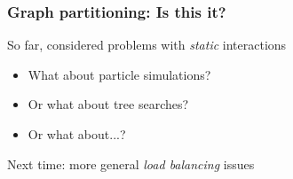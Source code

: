 \documentclass{beamer}
\begin{document}
\begin{frame}
  \frametitle{Graph partitioning: Is this it?}

  So far, considered problems with {\em static} interactions
  \begin{itemize}
  \item What about particle simulations?
  \item Or what about tree searches?
  \item Or what about...?
  \end{itemize}
  Next time: more general {\em load balancing} issues
\end{frame}
\end{document}
